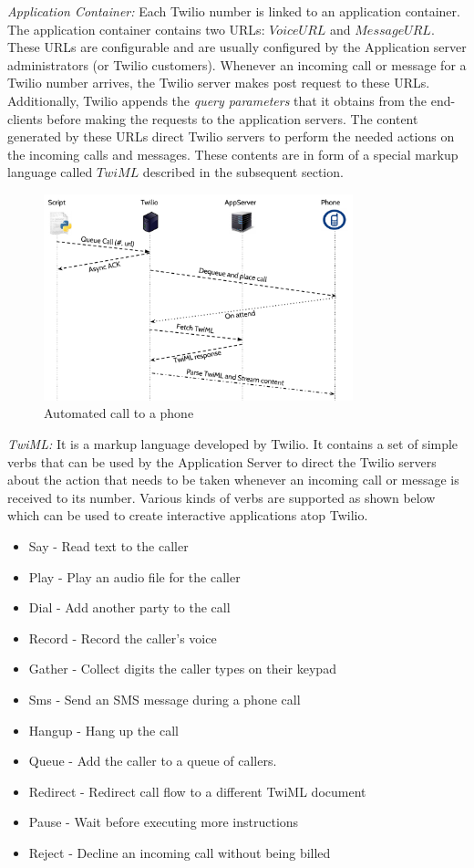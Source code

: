 \emph{Application Container: } Each Twilio number is linked to an application container. The application container contains two URLs: $Voice URL$ and $Message URL$. These URLs are configurable and are usually configured by the Application server administrators (or Twilio customers). Whenever an incoming call or message for a Twilio number arrives, the Twilio server makes post request to these URLs. Additionally, Twilio appends the \textit{query parameters} that it obtains from the end-clients before making the requests to the application servers. The content generated by these URLs direct Twilio servers to perform the needed actions on the incoming calls and messages. These contents are in form of a special markup language called $TwiML$ described in the subsequent section.  
\begin{figure}[t!] 
\centering
  \includegraphics[width=0.8\textwidth]{figs/auto.pdf}
\caption{Automated call to a phone}
\label{fig:autocall}
\end{figure} 

\emph{TwiML:  } It is a markup language developed by Twilio. It contains a set of simple verbs that can be used by the Application Server to direct the Twilio servers about the action that needs to be taken whenever an incoming call or message is received to its number. Various kinds of verbs are supported as shown below which can be used to create interactive applications atop Twilio.
\begin{itemize}
\item Say - Read text to the caller 
\item Play - Play an audio file for the caller
\item Dial - Add another party to the call
\item Record - Record the caller's voice
\item Gather - Collect digits the caller types on their keypad
\item Sms - Send an SMS message during a phone call
\item Hangup - Hang up the call
\item Queue - Add the caller to a queue of callers.
\item Redirect - Redirect call flow to a different TwiML document
\item Pause - Wait before executing more instructions
\item Reject - Decline an incoming call without being billed
\end{itemize}

